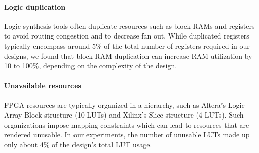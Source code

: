 \paragraph{Logic duplication} Logic synthesis tools often duplicate resources such as block RAMs
and registers to avoid routing congestion and to decrease fan out. While duplicated registers typically
encompass around 5\% of the total number of registers required in our designs, we found that block RAM
duplication can increase RAM utilization by 10 to 100\%, depending on the complexity of the design.


\paragraph{Unavailable resources} FPGA resources are typically organized in a hierarchy, such as Altera's Logic Array Block structure (10 LUTs)
and Xilinx's Slice structure (4 LUTs). Such organizations impose mapping constraints which can lead to
resources that are rendered unusable. In our experiments, the number of unusable LUTs made up only about 4\% of the design's total LUT usage.

